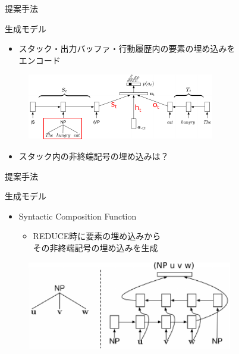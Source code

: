 \documentclass[aspectratio=43,unicode,10pt]{beamer}
\newcommand{\nt}{非終端記号}
\begin{document}
\begin{frame}{提案手法}
  \begin{block}{生成モデル}
    \begin{itemize}
      \item スタック・出力バッファ・行動履歴内の要素の埋め込みを\\エンコード
    \end{itemize}
    \begin{figure}
      \includegraphics[width=\textwidth]{fig/fig_5.pdf}
    \end{figure}
    \begin{itemize}
      \item スタック内の非終端記号の埋め込みは？
    \end{itemize}
  \end{block}
\end{frame}

\begin{frame}{提案手法}
  \begin{block}{生成モデル}
    \begin{itemize}
      \item Syntactic Composition Function
        \begin{itemize}
          \item REDUCE時に要素の埋め込みから\\その\nt の埋め込みを生成
        \end{itemize}
    \end{itemize}
    \begin{figure}
      \includegraphics[width=0.8\textwidth]{fig/fig_6.pdf}
    \end{figure}
  \end{block}
\end{frame}
\end{document}
